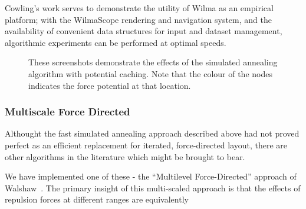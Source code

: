 \documentclass[runningheads]{cl2emult}
\begin{document}
Cowling's work serves to demonstrate the utility of Wilma as an empirical
platform; with the WilmaScope rendering and navigation system, and the
availability of convenient data structures for input and dataset management,
algorithmic experiments can be performed at optimal speeds.

\begin{figure}[h]
  \centering
  \caption{These screenshots demonstrate the effects of the simulated
  annealing algorithm with potential caching.  Note that the colour of
  the nodes indicates the force potential at that location.}
  \label{fig-fastlayout}
\end{figure}


\subsubsection{Multiscale Force Directed}

Althought the fast simulated annealing approach described above had not proved
perfect as an efficient replacement for iterated, force-directed layout, there
are other algorithms in the literature which might be brought to bear.

We have implemented one of these - the ``Multilevel Force-Directed'' approach
of Walshaw~\cite{walshaw00multilevel}.  The primary insight of this
multi-scaled approach is that the effects of repulsion forces at different
ranges are equivalently 
\end{document}
